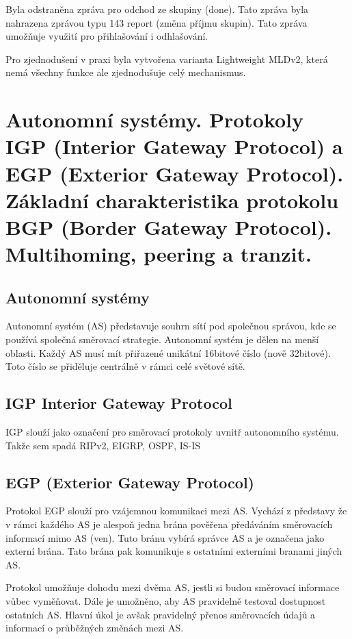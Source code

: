 Byla odstraněna zpráva pro odchod ze skupiny (done).
Tato zpráva byla nahrazena zprávou typu 143 report (změna příjmu skupin).
Tato zpráva umožňuje využití pro přihlašování i odhlašování.

Pro zjednodušení v praxi byla vytvořena varianta Lightweight MLDv2, která nemá všechny funkce ale zjednodušuje celý mechanismus.


\clearpage
\section{Autonomní systémy. Protokoly IGP (Interior Gateway Protocol) a EGP (Exterior Gateway Protocol). Základní charakteristika protokolu BGP (Border Gateway Protocol). Multihoming, peering a tranzit.}

\subsection{Autonomní systémy}

Autonomní systém (AS) představuje souhrn sítí pod společnou správou, kde se používá společná směrovací strategie.
Autonomní systém je dělen na menší oblasti.
Každý AS musí mít přiřazené unikátní 16bitové číslo (nově 32bitové).
Toto číslo se přiděluje centrálně v rámci celé světové sítě.

\subsection{IGP Interior Gateway Protocol}

IGP slouží jako označení pro směrovací protokoly uvnitř autonomního systému.
Takže sem spadá RIPv2, EIGRP, OSPF, IS-IS

\subsection{EGP (Exterior Gateway Protocol)}

Protokol EGP slouží pro vzájemnou komunikaci mezi AS.
Vychází z představy že v rámci každého AS je alespoň jedna brána pověřena předáváním směrovacích informací mimo AS (ven).
Tuto bránu vybírá správce AS a je označena jako externí brána.
Tato brána pak komunikuje s ostatními externími branami jiných AS.

Protokol umožňuje dohodu mezi dvěma AS, jestli si budou směrovací informace vůbec vyměňovat.
Dále je umožněno, aby AS pravidelně testoval dostupnost ostatních AS.
Hlavní úkol je avšak pravidelný přenos směrovacích údajů a informací o průběžných změnách mezi AS.

